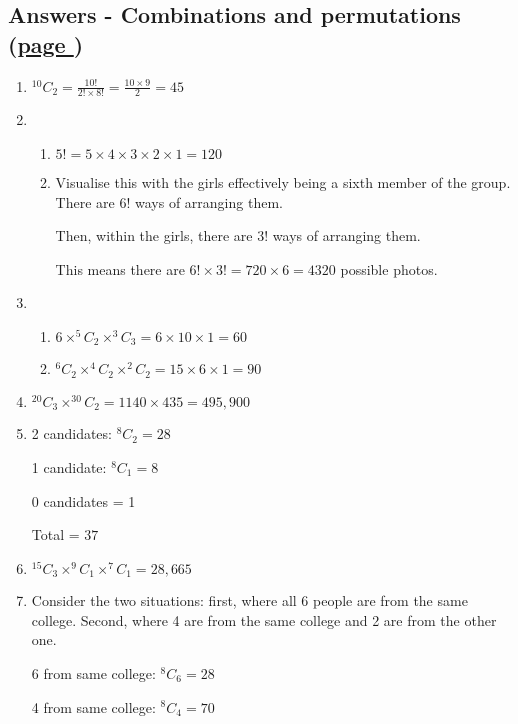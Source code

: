 \documentclass[../main.tex]{subfiles}
\begin{document}
\hypertarget{combinationsanswers}{\subsection*{Answers - Combinations and permutations (\hyperlink{combinationslink}{page \pageref{Combinations and permuations}})}}

\label{Combinations answers}
\begin{enumerate}
    \item
    \(^{10}C_2=\frac{10!}{2!\times 8!}=\frac{10\times 9}{2}=45\)
    \item 
        \begin{enumerate}
            \item 
            \(5!=5\times 4\times 3\times 2\times 1=120\)
            \item 
            Visualise this with the girls effectively being a sixth member of the group. There are \(6!\) ways of arranging them.

            Then, within the girls, there are \(3!\) ways of arranging them.

            This means there are \(6! \times 3!=720\times 6=4320\) possible photos.
        \end{enumerate}
    \item 
        \begin{enumerate}
            \item 
            \(6\times ^5C_2 \times ^3C_3 =6\times 10\times 1=60\)
            \item 
            \(^6C_2 \times ^4C_2 \times ^2C_2 = 15\times 6\times 1=90\)
        \end{enumerate}
    \item 
    \( ^{20}C_3\times ^{30}C_2 = 1140\times 435=495,900 \)
    \item 
    2 candidates: \(^8C_2 = 28\)

    1 candidate: \(^8C_1 = 8\)

    0 candidates  = 1

    Total = \(37\)
    \item 
    \(^{15}C_3 \times ^9C_1 \times ^7C_1 = 28,665\)
    \item 
    Consider the two situations: first, where all 6 people are from the same college. Second, where 4 are from the same college and 2 are from the other one.

    6 from same college: \(^8C_6=28\)

    4 from same college: \(^8C_4=70\)


\end{enumerate}
\end{document}
